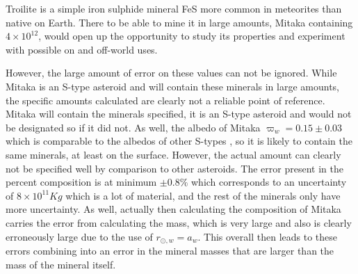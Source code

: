 \documentclass[10pt,twocolumn]{revtex4}    %
\newcommand*{\astrosun}{{\odot}}
\newcommand{\E}[1]{\times10^{#1}}
\newcommand{\rsm}{r_{\astrosun,w}}
\begin{document}
Troilite is a simple iron sulphide mineral FeS more common in meteorites than native on Earth. There to be able to mine it in large amounts, Mitaka containing $4\E{12}$, would open up the opportunity to study its properties and experiment with possible on and off-world uses. 

However, the large amount of error on these values can not be ignored. While Mitaka is an S-type asteroid and will contain these minerals in large amounts, the specific amounts calculated are clearly not a reliable point of reference. Mitaka will contain the minerals specified, it is an S-type asteroid and would not be designated so if it did not. As well, the albedo of Mitaka $\varpi_w = 0.15 \pm 0.03$ which is comparable to the albedos of other S-types \cite{mitakaAlbedo}, so it is likely to contain the same minerals, at least on the surface. However, the actual amount can clearly not be specified well by comparison to other asteroids. The error present in the percent composition is at minimum $\pm 0.8\%$ which corresponds to an uncertainty of $8\E{11} Kg$ which is a lot of material, and the rest of the minerals only have more uncertainty. As well, actually then calculating the composition of Mitaka carries the error from calculating the mass, which is very large and also is clearly erroneously large due to the use of $\rsm = a_w$. This overall then leads to these errors combining into an error in the mineral masses that are larger than the mass of the mineral itself.
\end{document}
